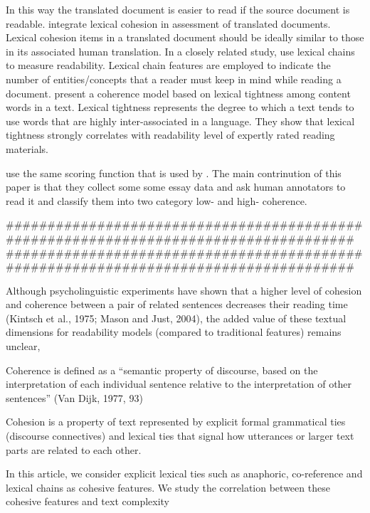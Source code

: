 In this way the translated document is easier to read if the source document is readable. 
 integrate lexical cohesion in assessment of translated documents. 
Lexical cohesion items in a translated document should be ideally similar to those in its associated human translation. 
In a closely related study,  use lexical chains to measure readability. 
Lexical chain features are employed to indicate the number of entities/concepts that a reader must keep in mind while reading a document.  
 present a coherence model based on lexical tightness among content words in a text. 
Lexical tightness represents the degree to which a text tends to use words that are highly inter-associated in a language. 
They show that lexical tightness strongly correlates with readability level of expertly rated reading materials. 

 use the same scoring function that is used by . 
The main contrinution of this paper is that they collect some some essay data and ask human annotators to read it and classify them into two category low- and high- coherence. 





#####################################################################################
\cite{todirascu16}
#####################################################################################

Although psycholinguistic experiments have shown that a higher level of cohesion and coherence between a pair of
related sentences decreases their reading time (Kintsch et al., 1975; Mason and Just, 2004), the added
value of these textual dimensions for readability models (compared to traditional features) remains unclear, 

Coherence is defined as a “semantic property of discourse, based on the interpretation of each individual
sentence relative to the interpretation of other sentences” (Van Dijk, 1977, 93)

Cohesion is a property of text represented by explicit formal grammatical ties (discourse connectives)
and lexical ties that signal how utterances or larger text parts are related to each other.

In this article, we consider explicit lexical ties such as anaphoric, co-reference and lexical chains as
cohesive features. We study the correlation between these cohesive features and text complexity


